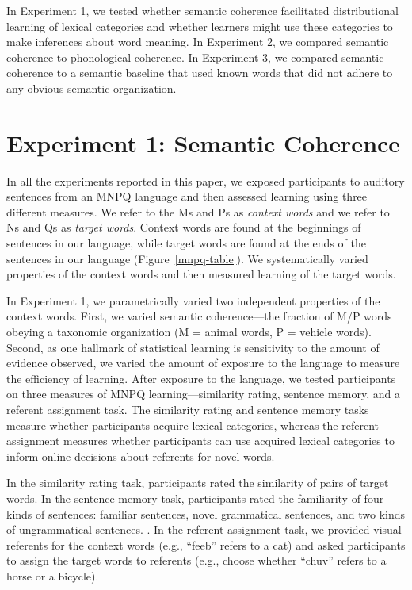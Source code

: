 \documentclass[man,floatsintext]{apa6}
\begin{document}
In Experiment 1, we tested whether semantic coherence facilitated distributional learning of lexical categories and whether learners might use these categories to make inferences about word meaning. In Experiment 2, we compared semantic coherence to phonological coherence. In Experiment 3, we compared semantic coherence to a semantic baseline that used known words that did not adhere to any obvious semantic organization.

\section{Experiment 1: Semantic Coherence}

In all the experiments reported in this paper, we exposed participants to auditory sentences from an MNPQ language and then assessed learning using three different measures. We refer to the Ms and Ps as \emph{context words} and we refer to Ns and Qs as \emph{target words}. Context words are found at the beginnings of sentences in our language, while target words are found at the ends of the sentences in our language (Figure~\ref{mnpq-table}). We systematically varied properties of the context words and then measured learning of the target words.

In Experiment 1, we parametrically varied two independent properties of the context words. First, we varied semantic coherence---the fraction of M/P words obeying a taxonomic organization (M = animal words, P = vehicle words). Second, as one hallmark of statistical learning is sensitivity to the amount of evidence observed, we varied the amount of exposure to the language to measure the efficiency of learning. After exposure to the language, we tested participants on three measures of MNPQ learning---similarity rating, sentence memory, and a referent assignment task. The similarity rating and sentence memory tasks measure whether participants acquire lexical categories, whereas the referent assignment measures whether participants can use acquired lexical categories to inform online decisions about referents for novel words.

In the similarity rating task, participants rated the similarity of pairs of target words. In the sentence memory task, participants rated the familiarity of four kinds of sentences: familiar sentences, novel grammatical sentences, and two kinds of ungrammatical sentences. . In the referent assignment task, we provided visual referents for the context words (e.g., ``feeb'' refers to a cat) and asked participants to assign the target words to referents (e.g., choose whether ``chuv'' refers to a horse or a bicycle).
\end{document}
